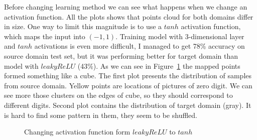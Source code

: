 \documentclass{article}
\begin{document}
Before changing learning method we can see what happens when we change an activation function. All the plots shows that points cloud for both domains differ in size. One way to limit this magnitude is to use a $tanh$ activation function, which maps the input into $(-1, 1)$. Training model with 3-dimensional layer and $tanh$ activations is even more difficult, I managed to get 78\% accuracy on source domain test set, but it was performing better for target domain than model with $leaky ReLU$ (43\%).  As we can see in Figure~\ref{fig:tanh} the mapped points formed something like a cube. The first plot presents the distribution of samples from source domain. Yellow points are locations of pictures of zero digit. We can see more those clusters on the edges of cube, so they should correspond to different digits. Second plot contains the distribution of target domain (gray). It is hard to find some pattern in them, they seem to be shuffled.

\begin{figure}[htb]%
\captionsetup[subfigure]{labelformat=empty}
    \centering
    \qquad
    \caption{Changing activation function form $leaky ReLU$ to $tanh$}%
    \label{fig:tanh}%
\end{figure}
\end{document}
